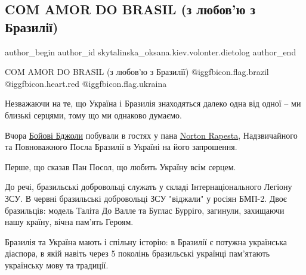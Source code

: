  
 
 
 
 
 
\subsection{COM AMOR DO BRASIL (з любов'ю з Бразилії)}
\label{sec:16_11_2022.fb.skytalinska_oksana.kiev.volonter.dietolog.1.com_amor_do_brasil}
 
\ifcmt
 author_begin
   author_id skytalinska_oksana.kiev.volonter.dietolog
 author_end
\fi

COM AMOR DO BRASIL (з любов'ю з Бразилії)
@igg{fbicon.flag.brazil} @igg{fbicon.heart.red} @igg{fbicon.flag.ukraina}

Незважаючи на те, що Україна і Бразилія знаходяться далеко одна від одної -- ми
близькі серцями, тому що ми однаково думаємо.

Вчора \href{https://www.facebook.com/beeukrainian}{Бойові Бджоли} побували в гостях у пана \href{https://www.facebook.com/norton.rapesta}{Norton Rapesta}, Надзвичайного та
Повноважного Посла Бразилії в Україні на його запрошення.

Перше, що сказав Пан Посол, що любить Україну всім серцем.

До речі, бразильські добровольці служать у складі Інтернаціонального Легіону
ЗСУ. В червні бразильські добровольці ЗСУ "віджали" у росіян БМП-2. Двоє
бразильців: модель Таліта До Валле та Буглас Бурріго, загинули, захищаючи нашу
країну, вічна пам'ять Героям.

Бразилія та Україна мають і спільну історію: в Бразилії є потужна українська
діаспора, в якій навіть через 5 поколінь бразильські українці пам'ятають
українську мову та традиції.


